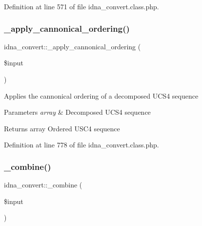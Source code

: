 Definition at line 571 of file idna\+\_\+convert.\+class.\+php.

\mbox{\label{classidna__convert_a3e0f3eceeb2987f2b69b9a3cf6f7181a}} 
\subsubsection{\texorpdfstring{\+\_\+apply\+\_\+cannonical\+\_\+ordering()}{\_apply\_cannonical\_ordering()}}
{\footnotesize\ttfamily idna\+\_\+convert\+::\+\_\+apply\+\_\+cannonical\+\_\+ordering (\begin{DoxyParamCaption}\item[{}]{\$input }\end{DoxyParamCaption})\hspace{0.3cm}{\ttfamily [protected]}}

Applies the cannonical ordering of a decomposed U\+C\+S4 sequence 
\begin{DoxyParams}{Parameters}
{\em array} & Decomposed U\+C\+S4 sequence \\
\hline
\end{DoxyParams}
\begin{DoxyReturn}{Returns}
array Ordered U\+S\+C4 sequence 
\end{DoxyReturn}


Definition at line 778 of file idna\+\_\+convert.\+class.\+php.

\mbox{\label{classidna__convert_a751b0b8bfacdc3b79eb77018a508363d}} 
\subsubsection{\texorpdfstring{\+\_\+combine()}{\_combine()}}
{\footnotesize\ttfamily idna\+\_\+convert\+::\+\_\+combine (\begin{DoxyParamCaption}\item[{}]{\$input }\end{DoxyParamCaption})\hspace{0.3cm}{\ttfamily [protected]}}


